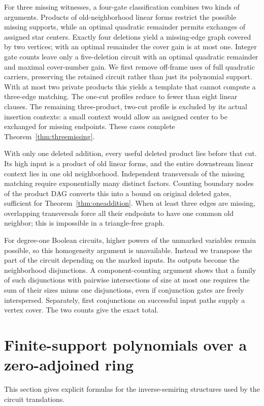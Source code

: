 \documentclass[11pt]{article}
\theoremstyle{definition}
\theoremstyle{remark}
\begin{document}
For three missing witnesses, a four-gate classification combines two kinds of arguments. Products of old-neighborhood linear forms restrict the possible missing supports, while an optimal quadratic remainder permits exchanges of assigned star centers. Exactly four deletions yield a missing-edge graph covered by two vertices; with an optimal remainder the cover gain is at most one. Integer gate counts leave only a five-deletion circuit with an optimal quadratic remainder and maximal cover-number gain. We first remove off-frame uses of full quadratic carriers, preserving the retained circuit rather than just its polynomial support. With at most two private products this yields a template that cannot compute a three-edge matching. The one-cut profiles reduce to fewer than eight linear clauses. The remaining three-product, two-cut profile is excluded by its actual insertion contexts: a small context would allow an assigned center to be exchanged for missing endpoints. These cases complete Theorem~\ref{thm:threemissing}.

With only one deleted addition, every useful deleted product lies before that cut. Its high input is a product of old linear forms, and the entire downstream linear context lies in one old neighborhood. Independent transversals of the missing matching require exponentially many distinct factors. Counting boundary nodes of the product DAG converts this into a bound on original deleted gates, sufficient for Theorem~\ref{thm:oneaddition}. When at least three edges are missing, overlapping transversals force all their endpoints to have one common old neighbor; this is impossible in a triangle-free graph.

For degree-one Boolean circuits, higher powers of the unmarked variables remain possible, so this homogeneity argument is unavailable. Instead we transpose the part of the circuit depending on the marked inputs. Its outputs become the neighborhood disjunctions. A component-counting argument shows that a family of such disjunctions with pairwise intersections of size at most one requires the sum of their sizes minus one disjunctions, even if conjunction gates are freely interspersed. Separately, first conjunctions on successful input paths supply a vertex cover. The two counts give the exact total.

\section{Finite-support polynomials over a zero-adjoined ring}
This section gives explicit formulas for the inverse-semiring structures used by the circuit translations.
\end{document}
